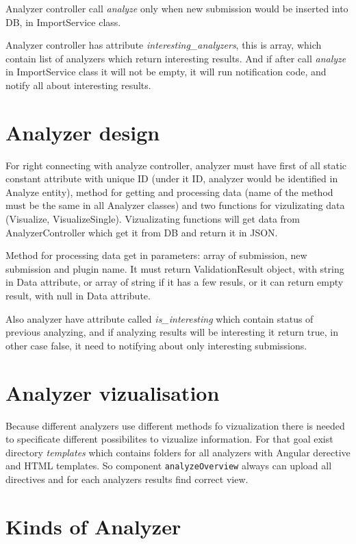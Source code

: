 Analyzer controller call \emph{analyze} only when new submission would be inserted into DB, in ImportService class.

Analyzer controller has attribute \emph{interesting_analyzers}, this is array, which contain list of analyzers which return interesting results. And if after call \emph{analyze} in ImportService class it will not be empty, it will run notification code, and notify all about interesting results.
\chapter{Analyzer design}

For right connecting with analyze controller, analyzer must have first of all static constant attribute with unique ID (under it ID, analyzer would be identified in Analyze entity), method for getting and processing data (name of the method must be the same in all Analyzer classes) and two functions for vizulizating data (Visualize, VisualizeSingle). Vizualizating functions will get data from AnalyzerController which get it from DB and return it in JSON.

Method for processing data get in parameters: array of submission, new submission and plugin name. It must return ValidationResult object, with string in Data attribute, or array of string if it has a few resuls, or it can return empty result, with null in Data attribute.

Also analyzer have attribute called \emph{is_interesting} which contain status of previous analyzing, and if analyzing results will be interesting it return true, in other case false, it need to notifying about only interesting submissions.

\chapter{Analyzer vizualisation}

Because different analyzers use different methods fo vizualization there is needed to specificate different possibilites to vizualize information. For that goal exist directory \emph{templates} which contains folders for all analyzers with Angular derective and HTML templates. So component \texttt{analyzeOverview} always can upload all directives and for each analyzers results find correct view.

\chapter{Kinds of Analyzer}


